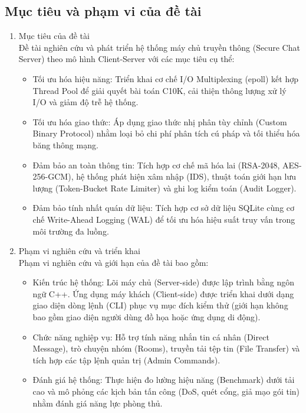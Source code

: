 \subsection{Mục tiêu và phạm vi của đề tài}
\begin{enumerate}
\item {Mục tiêu của đề tài} \\
Đề tài nghiên cứu và phát triển hệ thống máy chủ truyền thông (Secure Chat Server) theo mô hình Client-Server với các mục tiêu cụ thể:
\begin{itemize}[label={-}]
    \item Tối ưu hóa hiệu năng: Triển khai cơ chế I/O Multiplexing (epoll) kết hợp Thread Pool để giải quyết bài toán C10K, cải thiện thông lượng xử lý I/O và giảm độ trễ hệ thống.
    \item Tối ưu hóa giao thức: Áp dụng giao thức nhị phân tùy chỉnh (Custom Binary Protocol) nhằm loại bỏ chi phí phân tích cú pháp và tối thiểu hóa băng thông mạng.
    \item Đảm bảo an toàn thông tin: Tích hợp cơ chế mã hóa lai (RSA-2048, AES-256-GCM), hệ thống phát hiện xâm nhập (IDS), thuật toán giới hạn lưu lượng (Token-Bucket Rate Limiter) và ghi log kiểm toán (Audit Logger).
    \item Đảm bảo tính nhất quán dữ liệu: Tích hợp cơ sở dữ liệu SQLite cùng cơ chế Write-Ahead Logging (WAL) để tối ưu hóa hiệu suất truy vấn trong môi trường đa luồng.
\end{itemize}

\item {Phạm vi nghiên cứu và triển khai} \\
Phạm vi nghiên cứu và giới hạn của đề tài bao gồm:
\begin{itemize}[label={-}]
    \item Kiến trúc hệ thống: Lõi máy chủ (Server-side) được lập trình bằng ngôn ngữ C++. Ứng dụng máy khách (Client-side) được triển khai dưới dạng giao diện dòng lệnh (CLI) phục vụ mục đích kiểm thử (giới hạn không bao gồm giao diện người dùng đồ họa hoặc ứng dụng di động).
    \item Chức năng nghiệp vụ: Hỗ trợ tính năng nhắn tin cá nhân (Direct Message), trò chuyện nhóm (Rooms), truyền tải tệp tin (File Transfer) và tích hợp các tập lệnh quản trị (Admin Commands).
    \item Đánh giá hệ thống: Thực hiện đo lường hiệu năng (Benchmark) dưới tải cao và mô phỏng các kịch bản tấn công (DoS, quét cổng, giả mạo gói tin) nhằm đánh giá năng lực phòng thủ.
\end{itemize}
\end{enumerate}
